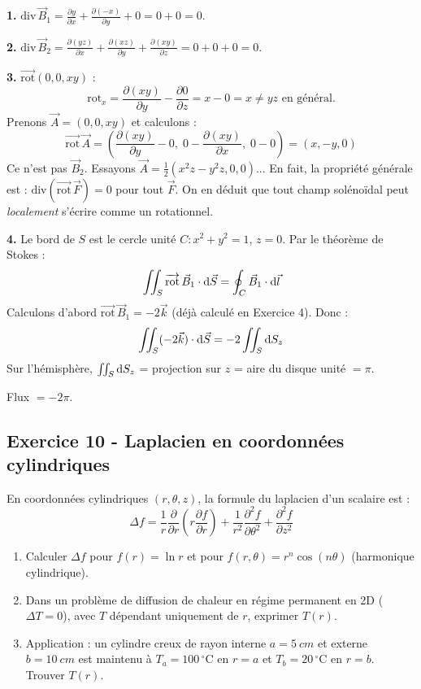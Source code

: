 \documentclass[12pt,a4paper]{article}
\begin{document}
\begin{boitecorrige}
\textbf{1.} $\text{div}\,\vec{B}_1 = \frac{\partial y}{\partial x}+\frac{\partial(-x)}{\partial y}+0 = 0+0 = 0$.

\textbf{2.} $\text{div}\,\vec{B}_2 = \frac{\partial(yz)}{\partial x}+\frac{\partial(xz)}{\partial y}+\frac{\partial(xy)}{\partial z} = 0+0+0 = 0$.

\textbf{3.} $\overrightarrow{\text{rot}}(0,0,xy)$ :
\[
\text{rot}_x = \frac{\partial(xy)}{\partial y}-\frac{\partial 0}{\partial z} = x-0 = x \neq yz \text{ en général}.
\]
Prenons $\vec{A} = (0, 0, xy)$ et calculons :
\[
\overrightarrow{\text{rot}}\,\vec{A} = \left(\frac{\partial(xy)}{\partial y}-0,\; 0-\frac{\partial(xy)}{\partial x},\; 0-0\right) = (x, -y, 0)
\]
Ce n'est pas $\vec{B}_2$. Essayons $\vec{A} = \frac{1}{2}(x^2 z - y^2 z, 0, 0)$... En fait, la propriété générale est : $\text{div}(\overrightarrow{\text{rot}}\,\vec{F}) = 0$ pour tout $\vec{F}$. On en déduit que tout champ solénoïdal peut \textit{localement} s'écrire comme un rotationnel.

\textbf{4.} Le bord de $S$ est le cercle unité $C : x^2+y^2=1$, $z=0$. Par le théorème de Stokes :
\[
\iint_S \overrightarrow{\text{rot}}\,\vec{B}_1\cdot\mathrm{d}\vec{S} = \oint_C \vec{B}_1\cdot\mathrm{d}\vec{l}
\]
Calculons d'abord $\overrightarrow{\text{rot}}\,\vec{B}_1 = -2\vec{k}$ (déjà calculé en Exercice 4). Donc :
\[
\iint_S (-2\vec{k})\cdot\mathrm{d}\vec{S} = -2\iint_S \mathrm{d} S_z
\]
Sur l'hémisphère, $\iint_S \mathrm{d} S_z$ = projection sur $z$ = aire du disque unité $= \pi$.

Flux $= -2\pi$.
\end{boitecorrige}

\subsection*{Exercice 10 - Laplacien en coordonnées cylindriques \niveau{\difficile}}

\begin{boiteexercice}
En coordonnées cylindriques $(r,\theta,z)$, la formule du laplacien d'un scalaire est :
\[
\Delta f = \frac{1}{r}\frac{\partial}{\partial r}\left(r\frac{\partial f}{\partial r}\right) + \frac{1}{r^2}\frac{\partial^2 f}{\partial\theta^2} + \frac{\partial^2 f}{\partial z^2}
\]
\begin{enumerate}
  \item Calculer $\Delta f$ pour $f(r) = \ln r$ et pour $f(r,\theta) = r^n\cos(n\theta)$ (harmonique cylindrique).
  \item Dans un problème de diffusion de chaleur en régime permanent en 2D ($\Delta T = 0$), avec $T$ dépendant uniquement de $r$, exprimer $T(r)$.
  \item Application : un cylindre creux de rayon interne $a=\qty{5}{cm}$ et externe $b=\qty{10}{cm}$ est maintenu à $T_a = 100\,\text{$^\circ$C}$ en $r=a$ et $T_b = 20\,\text{$^\circ$C}$ en $r=b$. Trouver $T(r)$.
\end{enumerate}
\end{boiteexercice}
\end{document}
